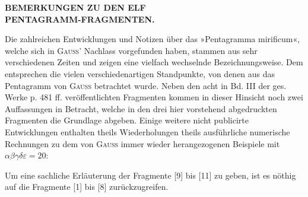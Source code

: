 \clearpage{}
\begin{center}\bfseries BEMERKUNGEN ZU DEN ELF\\PENTAGRAMM-FRAGMENTEN.\end{center}

Die zahlreichen Entwicklungen und Notizen über das »Pentagramma mirificum«, welche sich in
\textsc{Gauss}' Nachlass vorgefunden haben, stammen aus sehr verschiedenen Zeiten und zeigen eine
vielfach wechselnde Bezeichnungsweise. Dem entsprechen die vielen verschiedenartigen
Standpunkte, von denen aus das Pentagramm von \textsc{Gauss} betrachtet wurde. Neben den acht in
Bd. III der ges. Werke p. 481 ff. veröffentlichten Fragmenten kommen in dieser Hinsicht noch
zwei Auffassungen in Betracht, welche in den drei hier vorstehend abgedruckten Fragmenten die
Grundlage abgeben. Einige weitere nicht publicirte Entwicklungen enthalten theils
Wiederholungen theils ausführliche numerische Rechnungen zu dem von \textsc{Gauss} immer wieder
herangezogenen Beispiele mit $\alpha\beta\gamma\delta\varepsilon = 20$:

Um eine sachliche Erläuterung der Fragmente [9] bis [11] zu geben, ist es nöthig auf die
Fragmente [1] bis [8] zurückzugreifen.


